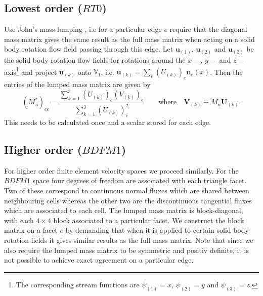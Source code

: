 \documentclass[12pt]{article}
\renewcommand{\vec}[1]{\boldsymbol{#1}}
\newcommand{\Vvelocity}{\mathbb{V}_1}
\begin{document}
\subsection{Lowest order ($RT0$)}
Use John's mass lumping \cite{Thuburn2013}, i.e for a particular edge $e$ require that the diagonal mass matrix gives the same result as the full mass matrix when acting on a solid body rotation flow field passing through this edge. Let $\vec{u}_{(1)}$, $\vec{u}_{(2)}$ and $\vec{u}_{(3)}$ be the solid body rotation flow fields for rotations around the $x-$, $y-$ and $z-$ axis\footnote{The corresponding stream functions are $\psi_{(1)} = x$, $\psi_{(2)}= y$ and $\psi_{(3)}=z$.} and project $\vec{u}_{(k)}$ onto $\Vvelocity$, i.e. $\vec{u}_{(k)} = \sum_e \left(U_{(k)}\right)_e \vec{u}_e(x)$. 
Then the entries of the lumped mass matrix are given by
\begin{equation}
  \left(M^*_{u}\right)_{ee} = \frac{\sum_{k=1}^3 \left(U_{(k)}\right)_e\left(V_{(k)}\right)_e}{\sum_{k=1}^3 \left(U_{(k)}\right)^2_e} \qquad
  \text{where}\quad \vec{V}_{(k)} \equiv M_{u} \vec{U}_{(k)}.
\end{equation}
This needs to be calculated once and a scalar stored for each edge.

\subsection{Higher order ($BDFM1$)}
For higher order finite element velocity spaces we proceed similarly. For the $BDFM1$ space four degrees of freedom are associated with each triangle facet. Two of these correspond to continuous normal fluxes which are shared between neighbouring cells whereas the other two are the discontinuous tangential fluxes which are associated to each cell.
The lumped mass matrix is block-diagonal, with each $4\times4$ block associated to a particular facet. We construct the block matrix on a facet $e$ by demanding that when it is applied to certain solid body rotation fields it gives similar results as the full mass matrix. Note that since we also require the lumped mass matrix to be symmetric and positiv definite, it is not possible to achieve exact agreement on a particular edge.
\end{document}
